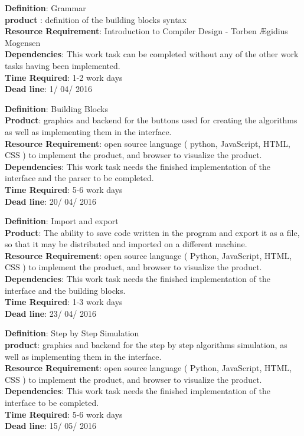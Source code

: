 \documentclass[11pt]{article}
\begin{document}
\noindent\textbf{Definition}:  Grammar \\
\textbf{product} : definition of the building blocks syntax\\
\textbf{Resource Requirement}: Introduction to Compiler Design - Torben Ægidius Mogensen \citep*{mogensen2011introduction}\\
\textbf{Dependencies}: This work task can be completed without any of the other work tasks having been implemented.\\
\textbf{Time Required}: 1-2 work days\\
\textbf{Dead line}: 1/ 04/ 2016\\
\noindent\makebox[\linewidth]{\rule{\paperwidth}{0.4pt}}

\noindent\textbf{Definition}: Building Blocks \\
\textbf{Product}: graphics and backend for the buttons used for creating the algorithms as well as implementing them in the interface.\\
\textbf{Resource Requirement}: open source language ( python, JavaScript, HTML, CSS ) to implement the product, and browser to visualize the product. \\
\textbf{Dependencies}: This work task needs the finished implementation of the interface and the parser to be completed.\\
\textbf{Time Required}: 5-6 work days\\
\textbf{Dead line}: 20/ 04/ 2016\\
\noindent\makebox[\linewidth]{\rule{\paperwidth}{0.4pt}}

\noindent\textbf{Definition}: Import and export \\
\textbf{Product}: The ability to save code written in the program and export it as a file, so that it may be distributed and imported on a different machine.\\
\textbf{Resource Requirement}: open source language ( Python, JavaScript, HTML, CSS ) to implement the product, and browser to visualize the product. \\
\textbf{Dependencies}: This work task needs the finished implementation of the interface and the building blocks.\\
\textbf{Time Required}: 1-3 work days\\
\textbf{Dead line}: 23/ 04/ 2016\\
\noindent\makebox[\linewidth]{\rule{\paperwidth}{0.4pt}}

\noindent\textbf{Definition}:  Step by Step Simulation\\
\textbf{product}: graphics and backend for the step by step  algorithms simulation, as well as implementing them in the interface.\\
\textbf{Resource Requirement}: open source language ( Python, JavaScript, HTML, CSS ) to implement the product, and browser to visualize the product. \\
\textbf{Dependencies}: This work task needs the finished implementation of the interface to be completed.\\
\textbf{Time Required}: 5-6 work days\\
\textbf{Dead line}: 15/ 05/ 2016\\
\noindent\makebox[\linewidth]{\rule{\paperwidth}{0.4pt}}
\end{document}
